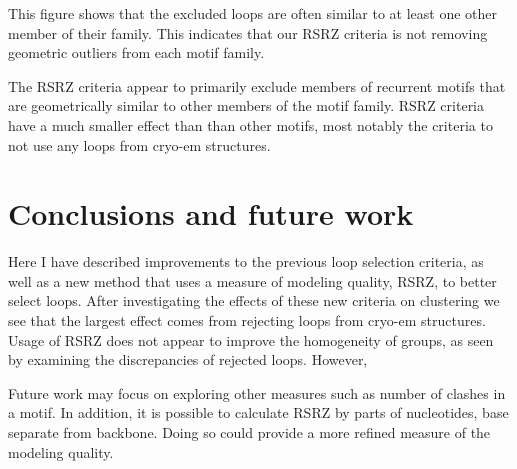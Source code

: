 This figure shows that the excluded loops are often similar to at least one
other member of their family. This indicates that our RSRZ criteria is not
removing geometric outliers from each motif family.

The RSRZ criteria appear to primarily exclude members of recurrent motifs that
are geometrically similar to other members of the motif family. RSRZ criteria
have a much smaller effect than than other motifs, most notably the criteria to
not use any loops from cryo-em structures.

\section{Conclusions and future work}

Here I have described improvements to the previous loop selection criteria, as
well as a new method that uses a measure of modeling quality, RSRZ, to better
select loops. After investigating the effects of these new criteria on
clustering we see that the largest effect comes from rejecting loops from
cryo-em structures. Usage of RSRZ does not appear to improve the homogeneity of
groups, as seen by examining the discrepancies of rejected loops. However,

Future work may focus on exploring other measures such as number of clashes in a
motif. In addition, it is possible to calculate RSRZ by parts of nucleotides,
base separate from backbone. Doing so could provide a more refined measure of
the modeling quality.
